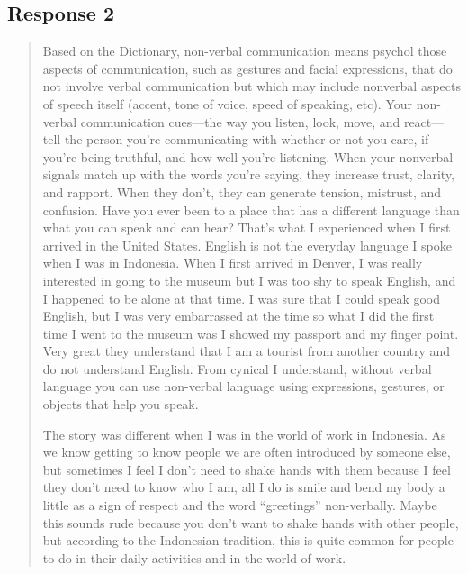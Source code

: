
\subsection{Response 2}
  \begin{quotation}
    Based on the Dictionary, non-verbal communication means psychol those
      aspects of communication, such as gestures and facial expressions, that
      do not involve verbal communication but which may include nonverbal
      aspects of speech itself (accent, tone of voice, speed of speaking, etc).
      Your non-verbal communication cues—the way you listen, look, move, and
      react—tell the person you’re communicating with whether or not you care,
      if you’re being truthful, and how well you’re listening. When your
      nonverbal signals match up with the words you’re saying, they increase
      trust, clarity, and rapport. When they don’t, they can generate tension,
      mistrust, and confusion. Have you ever been to a place that has a
      different language than what you can speak and can hear? That's what I
      experienced when I first arrived in the United States. English is not the
      everyday language I spoke when I was in Indonesia. When I first arrived in
      Denver, I was really interested in going to the museum but I was too shy
      to speak English, and I happened to be alone at that time. I was sure
      that I could speak good English, but I was very embarrassed at the time
      so what I did the first time I went to the museum was I showed my passport
      and my finger point. Very great they understand that I am a tourist from
      another country and do not understand English. From cynical I understand,
      without verbal language you can use non-verbal language using expressions,
      gestures, or objects that help you speak.

    The story was different when I was in the world of work in Indonesia. As we
      know getting to know people we are often introduced by someone else, but
      sometimes I feel I don't need to shake hands with them because I feel they
      don't need to know who I am, all I do is smile and bend my body a little
      as a sign of respect and the word   ``greetings'' non-verbally. Maybe this
      sounds rude because you don't want to shake hands with other people, but
      according to the Indonesian tradition, this is quite common for people to
      do in their daily activities and in the world of work.
  \end{quotation}

